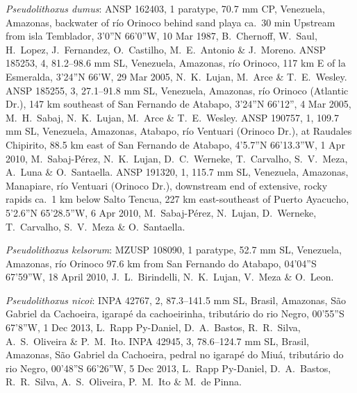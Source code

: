 \documentclass[12pt]{article}
\begin{document}
\noindent \emph{Pseudolithoxus dumus}: ANSP 162403, 1 paratype, 70.7 mm CP, Venezuela, Amazonas, backwater of río Orinoco behind sand playa ca.\ 30 min Upstream from isla Temblador, 3’0”N 66’0”W, 10 Mar 1987, B.\ Chernoff, W.\ Saul, H.\ Lopez, J.\ Fernandez, O.\ Castilho, M.\ E.\ Antonio \& J.\ Moreno. %
ANSP 185253, 4, 81.2--98.6 mm SL, Venezuela, Amazonas, río Orinoco, 117 km E of la Esmeralda, 3’24”N 66’W, 29 Mar 2005, N.\ K.\ Lujan, M.\ Arce \& T.\ E.\ Wesley. %
ANSP 185255, 3, 27.1--91.8 mm SL, Venezuela, Amazonas, río Orinoco (Atlantic Dr.), 147 km southeast of San Fernando de Atabapo, 3’24”N 66’12”, 4 Mar 2005, M.\ H.\ Sabaj, N.\ K.\ Lujan, M.\ Arce \& T.\ E.\ Wesley. %
ANSP 190757, 1, 109.7 mm SL, Venezuela, Amazonas, Atabapo, río Ventuari (Orinoco Dr.), at Raudales Chipirito, 88.5 km east of San Fernando de Atabapo, 4’5.7”N 66’13.3”W, 1 Apr 2010, M.\ Sabaj-Pérez, N.\ K.\ Lujan, D.\ C.\ Werneke, T.\ Carvalho, S.\ V.\ Meza, A.\ Luna \& O.\ Santaella. %
ANSP 191320, 1, 115.7 mm SL, Venezuela, Amazonas, Manapiare, río Ventuari (Orinoco Dr.), downstream end of extensive, rocky rapids ca.\ 1 km below Salto Tencua, 227 km east-southeast of Puerto Ayacucho, 5’2.6”N 65’28.5”W, 6 Apr 2010, M.\ Sabaj-Pérez, N.\ Lujan, D.\ Werneke, T.\ Carvalho, S.\ V.\ Meza \& O.\ Santaella.\\%
\bigskip

\noindent \emph{Pseudolithoxus kelsorum}: MZUSP 108090, 1 paratype, 52.7 mm SL, Venezuela, Amazonas, río Orinoco 97.6 km from San Fernando do Atabapo, 04’04”S 67’59”W, 18 April 2010, J.\ L.\ Birindelli, N.\ K.\ Lujan, V.\ Meza \& O.\ Leon.\\%
\bigskip

\noindent \emph{Pseudolithoxus nicoi}: INPA 42767, 2, 87.3--141.5 mm SL, Brasil, Amazonas, São Gabriel da Cachoeira, igarapé da cachoeirinha, tributário do rio Negro, 00’55”S 67’8”W, 1 Dec 2013, L.\ Rapp Py-Daniel, D.\ A.\ Bastos, R.\ R.\ Silva, A.\ S.\ Oliveira \& P.\ M.\ Ito. %
INPA 42945, 3, 78.6--124.7 mm SL, Brasil, Amazonas, São Gabriel da Cachoeira, pedral no igarapé do Miuá, tributário do rio Negro, 00’48”S 66’26”W, 5 Dec 2013, L.\ Rapp Py-Daniel, D.\ A.\ Bastos, R.\ R.\ Silva, A.\ S.\ Oliveira, P.\ M.\ Ito \& M.\ de Pinna.\\%
\bigskip
\end{document}
